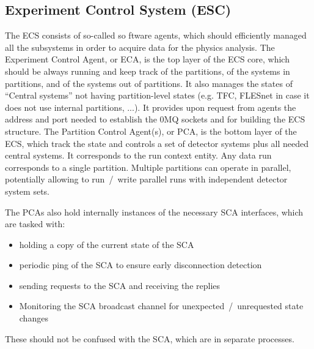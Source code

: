 \subsection{Experiment Control System (ESC)}\label{sssAgents}
The ECS consists of so-called so ftware agents, which should efficiently managed all the subsystems in order to acquire data for the physics analysis.
The Experiment Control Agent, or ECA, is the top layer of the ECS core, which should be always running and keep track of 
the partitions, of the systems in partitions, and of the systems out of partitions.  It also manages the states of ``Central systems'' not having partition-level states (e.g. TFC, FLESnet in case it does 
not use internal partitions, ...). It provides upon request from agents the address and port needed to establish the 0MQ sockets and for building the 
ECS structure. The Partition Control Agent(s), or PCA, is the bottom layer of the ECS, which track the state and controls a set of 
detector systems plus all needed central systems. It corresponds to the run context entity.  Any data run corresponds to a single partition. 
Multiple partitions can operate in parallel, potentially allowing to run~/~write parallel runs with independent 
detector system sets. 

The PCAs also hold internally instances of the necessary SCA interfaces, which are tasked with:
\begin{itemize}
 \item holding a copy of the current state of the SCA
 \item periodic ping of the SCA to ensure early disconnection detection
 \item sending requests to the SCA and receiving the replies
 \item Monitoring the SCA broadcast channel for unexpected~/~unrequested state changes
\end{itemize}
These should not be confused with the SCA, which are in separate processes.

